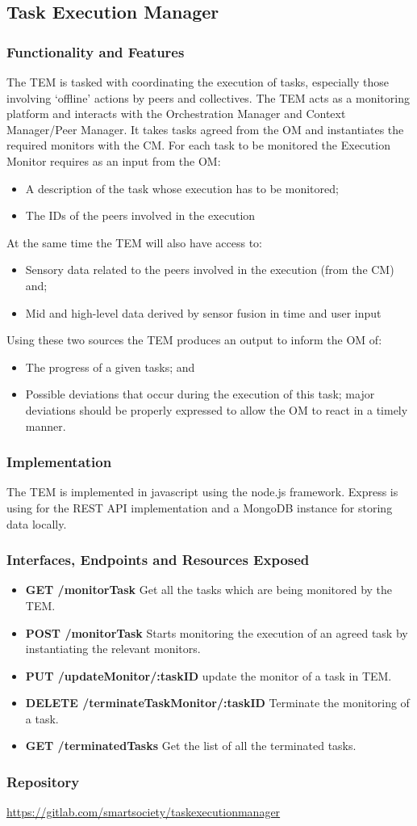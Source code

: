 \subsection{Task Execution Manager}
\subsubsection{Functionality and Features}
The TEM is tasked with coordinating the execution of tasks, especially those involving `offline' actions by peers and collectives. The TEM acts as a monitoring platform and interacts with the Orchestration Manager and Context Manager/Peer Manager. It takes tasks agreed from the OM and instantiates the required monitors with the CM.
For each task to be monitored the Execution Monitor requires as an input from the OM:
\begin{itemize} 
\item A description of the task whose execution has to be monitored; 
\item The IDs of the peers involved in the execution
\end{itemize}
At the same time the TEM will also have access to:
\begin{itemize}
\item Sensory data related to the peers involved in the execution (from the CM) and;
\item Mid and high-level data derived by sensor fusion in time and user input
\end{itemize}
Using these two sources the TEM produces an output to inform the OM of:
\begin{itemize}
\item The progress of a given tasks; and
\item Possible deviations that occur during the execution of this task; major deviations should be properly expressed to allow the OM to react in a timely manner.
\end{itemize}
\subsubsection{Implementation}
The TEM is implemented in javascript using the node.js framework. Express is using for the REST API implementation and a MongoDB instance for storing data locally.

\subsubsection{Interfaces, Endpoints and Resources Exposed}
\begin{itemize}
\item {\bf GET /monitorTask} Get all the tasks which are being monitored by the TEM.
\item {\bf POST /monitorTask} Starts monitoring the execution of an agreed task by instantiating the relevant monitors. 
\item {\bf PUT /updateMonitor/:taskID} update the monitor of a task in TEM.
\item {\bf DELETE /terminateTaskMonitor/:taskID} Terminate the monitoring of a task.
\item {\bf GET /terminatedTasks} Get the list of all the terminated tasks.
\end{itemize}
\subsubsection{Repository}
\url{https://gitlab.com/smartsociety/taskexecutionmanager}